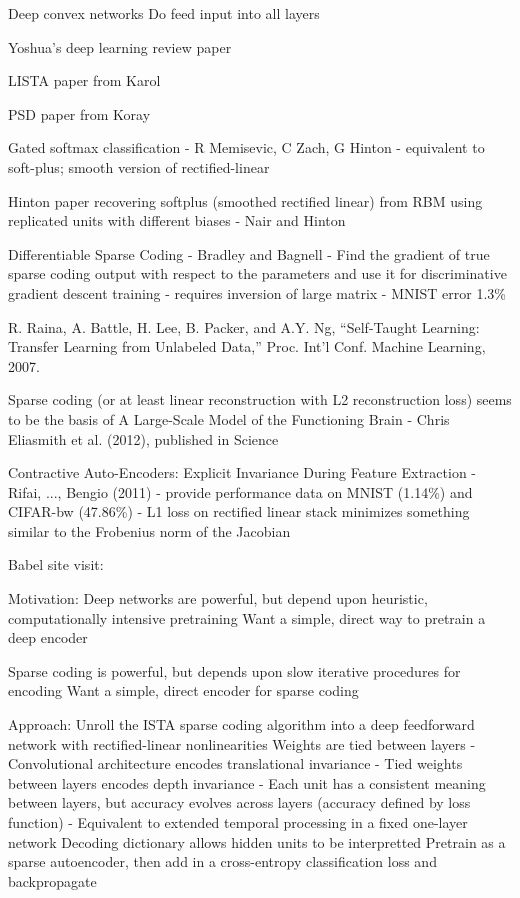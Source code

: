 Deep convex networks
Do feed input into all layers

Yoshua's deep learning review paper

LISTA paper from Karol

PSD paper from Koray

Gated softmax classification - R Memisevic, C Zach, G Hinton - equivalent to soft-plus; smooth version of rectified-linear

Hinton paper recovering softplus (smoothed rectified linear) from RBM using replicated units with different biases - Nair and Hinton

Differentiable Sparse Coding - Bradley and Bagnell - Find the gradient of true sparse coding output with respect to the parameters and use it for discriminative gradient descent training - requires inversion of large matrix - MNIST error 1.3\%


R. Raina, A. Battle, H. Lee, B. Packer, and A.Y. Ng, “Self-Taught Learning: Transfer Learning from Unlabeled Data,” Proc. Int’l Conf. Machine Learning, 2007.

Sparse coding (or at least linear reconstruction with L2 reconstruction loss) seems to be the basis of A Large-Scale Model of the Functioning Brain - Chris Eliasmith et al. (2012), published in Science


Contractive Auto-Encoders: Explicit Invariance During Feature Extraction - Rifai, ..., Bengio (2011) - provide performance data on MNIST (1.14\%) and CIFAR-bw (47.86\%) - L1 loss on rectified linear stack minimizes something similar to the Frobenius norm of the Jacobian



Babel site visit:

Motivation:
Deep networks are powerful, but depend upon heuristic, computationally intensive pretraining
Want a simple, direct way to pretrain a deep encoder

Sparse coding is powerful, but depends upon slow iterative procedures for encoding
Want a simple, direct encoder for sparse coding


Approach:
Unroll the ISTA sparse coding algorithm into a deep feedforward network with rectified-linear nonlinearities
Weights are tied between layers
  - Convolutional architecture encodes translational invariance
  - Tied weights between layers encodes depth invariance
  - Each unit has a consistent meaning between layers, but accuracy evolves across layers (accuracy defined by loss function)
  - Equivalent to extended temporal processing in a fixed one-layer network
Decoding dictionary allows hidden units to be interpretted
Pretrain as a sparse autoencoder, then add in a cross-entropy classification loss and backpropagate

